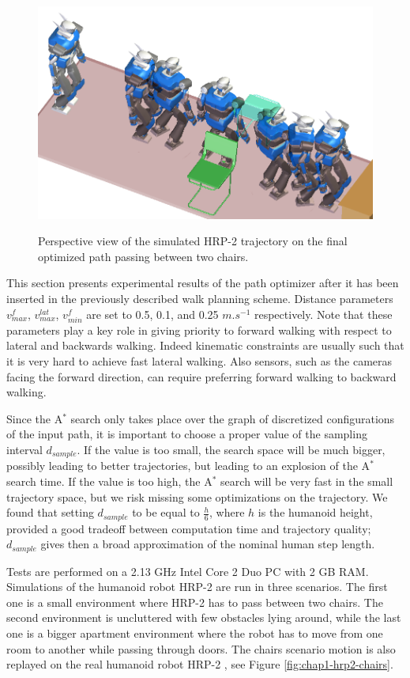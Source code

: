 \begin{figure}
  \centering
      {\includegraphics[width = 0.8\linewidth]
        {src/chap1-path-optimization/chairs-hash-optim-perspective-hrp2.png}}
      \caption{Perspective view of the simulated HRP-2 trajectory on
        the final optimized path passing between two chairs.}
      \label{fig:chap1-chairs-hash-optim-perspective-hrp2}
\end{figure}

This section presents experimental results of the path optimizer after
it has been inserted in the previously described walk planning
scheme. Distance parameters $v_{max}^f$, $v_{max}^{lat}$, $v_{min}^f$
are set to 0.5, 0.1, and 0.25 $m.s^{-1}$ respectively. Note that these
parameters play a key role in giving priority to forward walking with
respect to lateral and backwards walking. Indeed kinematic constraints
are usually such that it is very hard to achieve fast lateral
walking. Also sensors, such as the cameras facing the forward
direction, can require preferring forward walking to backward walking.

Since the A$^{*}$ search only takes place over the graph of
discretized configurations of the input path, it is important to
choose a proper value of the sampling interval $d_{sample}$. If the
value is too small, the search space will be much bigger, possibly
leading to better trajectories, but leading to an explosion of the
A$^{*}$ search time. If the value is too high, the A$^{*}$ search will
be very fast in the small trajectory space, but we risk missing some
optimizations on the trajectory. We found that setting $d_{sample}$ to
be equal to $\frac{h}{6}$, where $h$ is the humanoid height, provided
a good tradeoff between computation time and trajectory quality;
$d_{sample}$ gives then a broad approximation of the nominal human
step length.

Tests are performed on a 2.13 GHz Intel Core 2 Duo PC with 2 GB RAM.
Simulations of the humanoid robot HRP-2 are run in three scenarios.
The first one is a small environment where HRP-2 has to pass between
two chairs. The second environment is uncluttered with few obstacles
lying around, while the last one is a bigger apartment environment
where the robot has to move from one room to another while passing
through doors. The chairs scenario motion is also replayed on the real
humanoid robot HRP-2 \cite{kane04}, see Figure
\ref{fig:chap1-hrp2-chairs}.

